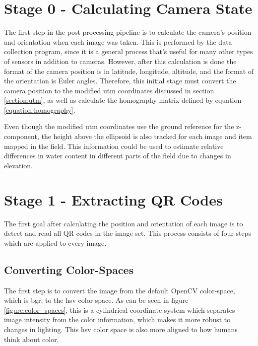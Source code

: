 \section{Stage 0 - Calculating Camera State}
\label{processing-stage0}

The first step in the post-processing pipeline is to calculate the camera's position and orientation when each image was taken.  This is performed by the data collection program, since it is a general process that's useful for many other types of sensors in addition to cameras.  However, after this calculation is done the format of the camera position is in latitude, longitude, altitude, and the format of the orientation is Euler angles.  Therefore, this initial stage must convert the camera position to the modified \ac{utm} coordinates discussed in section \ref{section:utm}, as well as calculate the homography matrix defined by equation \ref{equation:homography}.  

Even though the modified \ac{utm} coordinates use the ground reference for the z-component, the height above the ellipsoid is also tracked for each image and item mapped in the field.  This information could be used to estimate relative differences in water content in different parts of the field due to changes in elevation. 

\section{Stage 1 - Extracting QR Codes}
\label{processing-stage1}

The first goal after calculating the position and orientation of each image is to detect and read all QR codes in the image set.  This process consists of four steps which are applied to every image.

\subsection{Converting Color-Spaces}

The first step is to convert the image from the default OpenCV color-space, which is \ac{bgr}, to the \ac{hsv} color space.  As can be seen in figure \ref{figure:color_spaces}, this is a cylindrical coordinate system which separates image intensity from the color information, which makes it more robust to changes in lighting. This \ac{hsv} color space is also more aligned to how humans think about color.

